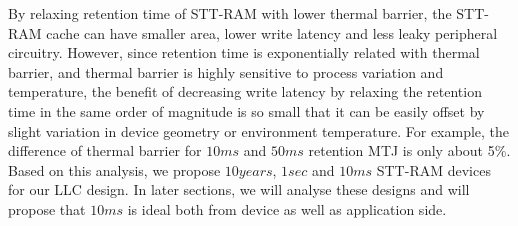 By relaxing retention time of STT-RAM with lower thermal barrier, the STT-RAM cache can have smaller
area, lower write latency and less leaky peripheral circuitry. However, since retention time is
exponentially related with thermal barrier, and thermal barrier is highly sensitive to process
variation and temperature, the benefit of decreasing write latency by relaxing the retention time in
the same order of magnitude is so small that it can be easily offset by slight variation in device
geometry or environment temperature. For example, the difference of thermal barrier for $10ms$ and
$50ms$ retention MTJ is only about 5\%.
Based on this analysis, we propose $10years$, $1sec$ and $10ms$ STT-RAM devices for our
LLC design. In later sections, we will analyse these designs and will propose that $10ms$ is ideal
both from device as well as application side.
